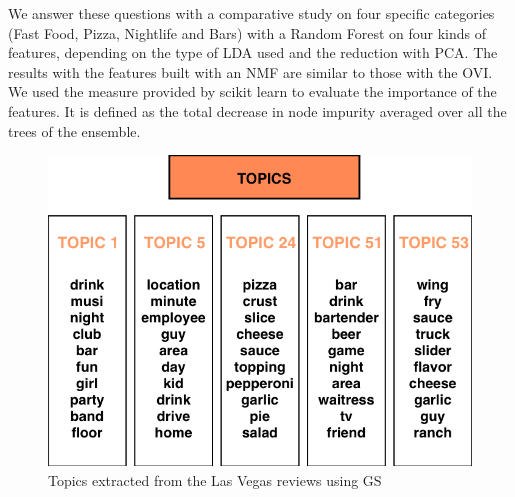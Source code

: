 \documentclass[twoside]{article}
\begin{document}
\begin{multicols}{2}
\noindent We answer these questions with a comparative study on four specific categories (Fast Food, Pizza, Nightlife and Bars) with a Random Forest on four kinds of features, depending on the type of LDA used and the reduction with PCA. The results with the features built with an NMF are similar to those with the OVI. We used the measure provided by scikit learn to evaluate the importance of the features. It is defined as the total decrease in node impurity averaged over all the trees of the ensemble.

\begin{figure}[H]
\centering
\includegraphics[width=1\linewidth]{img/gs_topics.png}
\caption{Topics extracted from the Las Vegas reviews using GS}
\end{figure}



\end{multicols}
\end{document}

